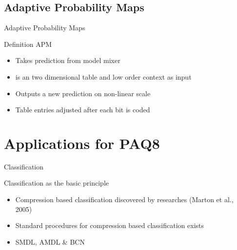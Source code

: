 \documentclass[11pt,usenames,dvipsnames]{beamer}
\begin{document}
\subsection{Adaptive Probability Maps}
\begin{frame}{Adaptive Probability Maps}
	\begin{alertblock}{Definition APM}
		\begin{itemize}
			\item Takes prediction from model mixer
			\item is an two dimensional table and low order context as input
			\item Outputs a new prediction on non-linear scale
			\item Table entries adjusted after each bit is coded
		\end{itemize}
	\end{alertblock}

\end{frame}

\section{Applications for PAQ8}
\begin{frame}{Classification}
	\begin{exampleblock}{Classification as the basic principle}
		\begin{itemize}
			\item Compression based classification discovered by researches (Marton et al., 2005)
			\item Standard procedures for compression based classification exists
			\item SMDL, AMDL \&  BCN 
		\end{itemize}
	\end{exampleblock}
	

\end{frame}
\end{document}
